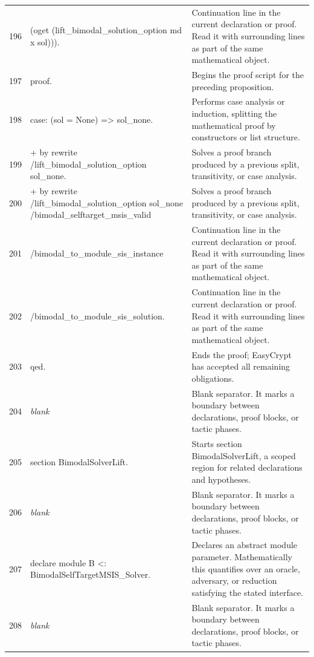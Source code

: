 \documentclass[10pt]{article}
\begin{document}
\begin{longtable}{r L{0.53\textwidth} L{0.37\textwidth}}
196 & {\ttfamily\scriptsize      (oget (lift\_bimodal\_solution\_option md x sol))).} & Continuation line in the current declaration or proof.  Read it with surrounding lines as part of the same mathematical object. \\
197 & {\ttfamily\scriptsize proof.} & Begins the proof script for the preceding proposition. \\
198 & {\ttfamily\scriptsize case: (sol = None) => sol\_none.} & Performs case analysis or induction, splitting the mathematical proof by constructors or list structure. \\
199 & {\ttfamily\scriptsize + by rewrite /lift\_bimodal\_solution\_option sol\_none.} & Solves a proof branch produced by a previous split, transitivity, or case analysis. \\
200 & {\ttfamily\scriptsize + by rewrite /lift\_bimodal\_solution\_option sol\_none /bimodal\_selftarget\_msis\_valid} & Solves a proof branch produced by a previous split, transitivity, or case analysis. \\
201 & {\ttfamily\scriptsize              /bimodal\_to\_module\_sis\_instance} & Continuation line in the current declaration or proof.  Read it with surrounding lines as part of the same mathematical object. \\
202 & {\ttfamily\scriptsize              /bimodal\_to\_module\_sis\_solution.} & Continuation line in the current declaration or proof.  Read it with surrounding lines as part of the same mathematical object. \\
203 & {\ttfamily\scriptsize qed.} & Ends the proof; EasyCrypt has accepted all remaining obligations. \\
204 & {\ttfamily\scriptsize \emph{blank}} & Blank separator.  It marks a boundary between declarations, proof blocks, or tactic phases. \\
205 & {\ttfamily\scriptsize section BimodalSolverLift.} & Starts section BimodalSolverLift, a scoped region for related declarations and hypotheses. \\
206 & {\ttfamily\scriptsize \emph{blank}} & Blank separator.  It marks a boundary between declarations, proof blocks, or tactic phases. \\
207 & {\ttfamily\scriptsize declare module B <: BimodalSelfTargetMSIS\_Solver.} & Declares an abstract module parameter.  Mathematically this quantifies over an oracle, adversary, or reduction satisfying the stated interface. \\
208 & {\ttfamily\scriptsize \emph{blank}} & Blank separator.  It marks a boundary between declarations, proof blocks, or tactic phases. \\

\end{longtable}
\end{document}
